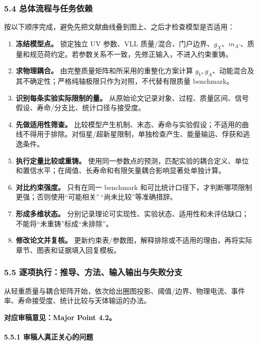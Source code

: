 \documentclass[
  chinese,
  UTF8]{ctexart}
\providecommand{\tightlist}{%
  \setlength{\itemsep}{0pt}\setlength{\parskip}{0pt}}
\begin{document}
\subsubsection{5.4 总体流程与任务依赖}\label{major-4-step-4}

按以下顺序完成，避免先把文献曲线叠到图上、之后才检查模型是否适用：

\begin{enumerate}
\def\labelenumi{\arabic{enumi}.}
\tightlist
\item
  \textbf{冻结模型点。} 锁定独立 UV 参数、VLL
  质量/混合、门户边界、\(g_X\)、\(m_{A'}\)、质量和规范荷约定。若参数关系不一致，先修正输入，不进入约束重铸。
\item
  \textbf{求物理耦合。} 由完整质量矩阵和所采用的重整化方案计算
  \(g_V,g_A\)、动能混合及其不确定性；严格纯轴极限只作为对照，不代替有限质量
  benchmark。
\item
  \textbf{识别每条实验实际限制的量。}
  从原始论文记录对象、过程、质量区间、信号假设、寿命/分支比、统计口径与接受度。
\item
  \textbf{先做适用性筛查。}
  比较模型产生机制、末态、寿命与实验假设；不适用的曲线不得用于排除。对恒星/超新星限制，单独检查产生、能量输运、俘获和逃逸条件。
\item
  \textbf{执行定量比较或重铸。}
  使用同一参数点的预测，匹配实验的耦合定义、单位和置信水平；在阈值、长寿命和有限矢量耦合影响显著处单独计算。
\item
  \textbf{对比约束强度。} 只有在同一 benchmark
  和可比统计口径下，才判断哪项限制更强；否则使用``可能相关''\,``尚未比较''等准确措辞。
\item
  \textbf{形成多维状态。}
  分别记录理论可实现性、实验状态、适用性和未评估缺口；不能将``未重铸''标成``未排除''。
\item
  \textbf{修改论文并复核。}
  更新约束表/参数图，解释排除或不适用的理由，再将实际章节、图表和证据填入回复模板。
\end{enumerate}

\subsubsection{5.5
逐项执行：推导、方法、输入输出与失败分支}\label{major-4-step-5}

从轻重质量与耦合矩阵开始，依次给出圈图投影、阈值/边界、物理电流、事件率、寿命接受度、统计比较与天体输运的办法。

\textbf{对应审稿意见：Major Point 4.2。}

\paragraph{5.5.1
审稿人真正关心的问题}\label{ux5ba1ux7a3fux4ebaux771fux6b63ux5173ux5fc3ux7684ux95eeux9898-1}
\end{document}
